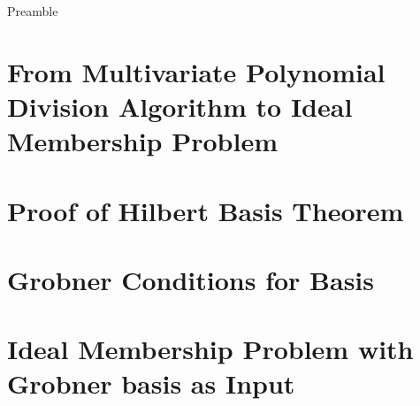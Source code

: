            
\noindent
Preamble

\section{From Multivariate Polynomial Division Algorithm to Ideal Membership Problem}
\section{Proof of Hilbert Basis Theorem}
\section{Grobner Conditions for Basis}
\section{Ideal Membership Problem with Grobner basis as Input}
